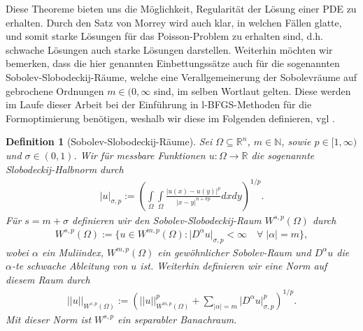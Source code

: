 \documentclass[bibliography=totoc,12pt,a4paper]{scrartcl}
\theoremstyle{exampstyle}
\newtheorem{defi}{Definition}%
\numberwithin{equation}{section}
\begin{document}
Diese Theoreme bieten uns die Möglichkeit, Regularität der Lösung einer PDE zu erhalten. Durch den Satz von Morrey wird auch klar, in welchen Fällen glatte, und somit starke Lösungen für das Poisson-Problem zu erhalten sind, d.h. schwache Lösungen auch starke Lösungen darstellen. Weiterhin möchten wir bemerken, dass die hier genannten Einbettungssätze auch für die sogenannten Sobolev-Slobodeckij-Räume, welche eine Verallgemeinerung der Sobolevräume auf gebrochene Ordnungen $m \in (0,\infty$ sind, im selben Wortlaut gelten. Diese werden im Laufe dieser Arbeit bei der Einführung in l-BFGS-Methoden für die Formoptimierung benötigen, weshalb wir diese im Folgenden definieren, vgl \cite{brokenSobolev}.

\begin{defi}[Sobolev-Slobodeckij-Räume]
Sei $\Omega \subseteq \mathbb{R}^n$, $m\in\mathbb{N}$, sowie $p\in [1, \infty)$ und $\sigma\in (0,1)$. Wir für messbare Funktionen $u: \Omega \rightarrow \mathbb{R}$ die sogenannte \textit{Slobodeckij-Halbnorm} durch
\begin{align*}
	\vert u \vert _{\sigma, p} := (\underset{\Omega}{\int}\underset{\Omega}{\int} 
	\frac{\vert u(x) - u(y)\vert^p}{\vert x-y \vert^{n + \sigma p}}dxdy)^{1/p}.
\end{align*}
Für $s = m + \sigma$ definieren wir den \textit{Sobolev-Slobodeckij-Raum} $W^{s,p}(\Omega)$ durch
\begin{align*}
	W^{s,p}(\Omega) := \{ u\in W^{m,p}(\Omega) : \vert D^\alpha u \vert _{\sigma, p} < \infty 				\quad \forall \;\vert\alpha\vert = m\},
\end{align*}
wobei $\alpha$ ein Muliindex, $W^{m,p}(\Omega)$ ein gewöhnlicher Sobolev-Raum und $D^\alpha u$ die $\alpha$-te schwache Ableitung von $u$ ist.
Weiterhin definieren wir eine Norm auf diesem Raum durch
\begin{align*}
	\vert\vert u \vert\vert_{W^{s,p}(\Omega)} := (\vert\vert u \vert\vert_{W^{m,p}(\Omega)}^p + \underset{ \vert \alpha \vert = m}{\sum}\vert D^\alpha u \vert _{\sigma, p}^p)^{1/p}.
\end{align*}
Mit dieser Norm ist $W^{s,p}$ ein separabler Banachraum.
\end{defi}
\end{document}
